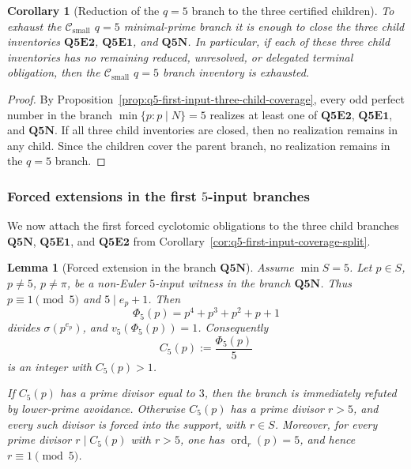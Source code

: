 \documentclass[11pt]{article}
\newtheorem{lemma}[theorem]{Lemma}
\newtheorem{corollary}[theorem]{Corollary}
\theoremstyle{definition}
\theoremstyle{remark}
\DeclareMathOperator{\ord}{ord}
\newcommand{\Csmall}{\ensuremath{\mathcal C_{\mathrm{small}}}}
\begin{document}
\begin{corollary}[Reduction of the \(q=5\) branch to the three certified children]
\label{cor:q5-reduction-to-three-certified-children}
To exhaust the \(\Csmall\) \(q=5\) minimal-prime branch it is enough to close
the three child inventories \(\mathbf{Q5E2}\), \(\mathbf{Q5E1}\), and
\(\mathbf{Q5N}\).
In particular, if each of these three child inventories has no remaining
reduced, unresolved, or delegated terminal obligation, then the \(\Csmall\)
\(q=5\) branch inventory is exhausted.
\end{corollary}

\begin{proof}
By Proposition~\ref{prop:q5-first-input-three-child-coverage}, every odd perfect
number in the branch
\(\min\{p:p\mid N\}=5\) realizes at least one of \(\mathbf{Q5E2}\),
\(\mathbf{Q5E1}\), and \(\mathbf{Q5N}\).
If all three child inventories are closed, then no realization remains in any
child.  Since the children cover the parent branch, no realization remains in
the \(q=5\) branch.
\end{proof}



\subsubsection{Forced extensions in the first $5$-input branches}

We now attach the first forced cyclotomic obligations to the three child
branches \(\mathbf{Q5N}\), \(\mathbf{Q5E1}\), and \(\mathbf{Q5E2}\) from
Corollary~\ref{cor:q5-first-input-coverage-split}.

\begin{lemma}[Forced extension in the branch $\mathbf{Q5N}$]
\label{lem:q5n-forced-extension}
Assume \(\min S=5\).  Let \(p\in S\), \(p\ne5\), \(p\ne\pi\), be a non-Euler
\(5\)-input witness in the branch \(\mathbf{Q5N}\).  Thus
\(p\equiv1\pmod5\) and \(5\mid e_p+1\).
Then
\[
  \Phi_5(p)=p^4+p^3+p^2+p+1
\]
divides \(\sigma(p^{e_p})\), and \(v_5(\Phi_5(p))=1\).
Consequently
\[
  C_5(p):=\frac{\Phi_5(p)}5
\]
is an integer with \(C_5(p)>1\).

If \(C_5(p)\) has a prime divisor equal to \(3\), then the branch is immediately
refuted by lower-prime avoidance.  Otherwise \(C_5(p)\) has a prime divisor
\(r>5\), and every such divisor is forced into the support, with \(r\in S\).
Moreover, for every prime divisor \(r\mid C_5(p)\) with \(r>5\), one has
\(\ord_r(p)=5\), and hence \(r\equiv1\pmod5\).
\end{lemma}
\end{document}
